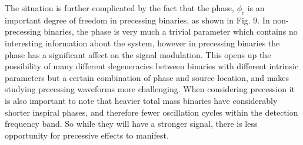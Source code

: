 \documentclass[11pt]{article}
\begin{document}
The situation is further complicated by the fact that the phase, $\phi_c$ is an important degree of freedom in precessing binaries, as shown in Fig. 9. In non-precessing binaries, the phase is very much a trivial parameter which contains no interesting information about the system, however in precessing binaries the phase has a significant affect on the signal modulation. This opens up the possibility of many different degeneracies between binaries with different intrinsic parameters but a certain combination of phase and source location, and makes studying precessing waveforms more challenging. When considering precession it is also important to note that heavier total mass binaries have considerably shorter inspiral phases, and therefore fewer oscillation cycles within the detection frequency band. So while they will have a stronger signal, there is less opportunity for precessive effects to manifest.
\end{document}
